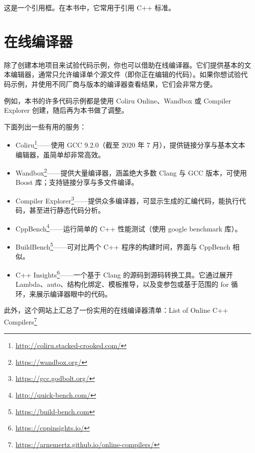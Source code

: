 \begin{myQuote}
这是一个引用框。在本书中，它常用于引用 C++ 标准。
\end{myQuote}

\section{在线编译器}

除了创建本地项目来试验代码示例，你也可以借助在线编译器。它们提供基本的文本编辑器，通常只允许编译单个源文件（即你正在编辑的代码）。如果你想试验代码示例，并使用不同厂商与版本的编译器查看结果，它们会非常方便。

例如，本书的许多代码示例都是使用 Coliru Online、Wandbox 或 Compiler Explorer 创建，随后再为本书做了调整。

下面列出一些有用的服务：

\begin{itemize}
\item Coliru\footnote{\url{http://coliru.stacked-crooked.com/}}——使用 GCC 9.2.0（截至 2020 年 7 月），提供链接分享与基本文本编辑器，虽简单却非常高效。
\item Wandbox\footnote{\url{https://wandbox.org/}}——提供大量编译器，涵盖绝大多数 Clang 与 GCC 版本，可使用 Boost 库；支持链接分享与多文件编译。
\item Compiler Explorer\footnote{\url{https://gcc.godbolt.org/}}——提供众多编译器，可显示生成的汇编代码，能执行代码，甚至进行静态代码分析。
\item CppBench\footnote{\url{http://quick-bench.com/}}——运行简单的 C++ 性能测试（使用 google benchmark 库）。
\item BuildBench\footnote{\url{https://build-bench.com}}——可对比两个 C++ 程序的构建时间，界面与 CppBench 相似。
\item C++ Insights\footnote{\url{https://cppinsights.io/}}——一个基于 Clang 的源码到源码转换工具。它通过展开 Lambda、auto、结构化绑定、模板推导，以及变参包或基于范围的 for 循环，来展示编译器眼中的代码。
\end{itemize}

此外，这个网站上汇总了一份实用的在线编译器清单：List of Online C++ Compilers\footnote{\url{https://arnemertz.github.io/online-compilers/}}
